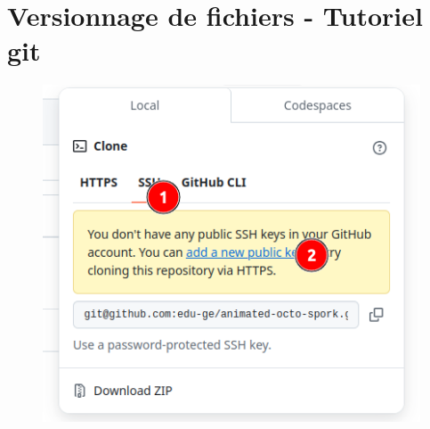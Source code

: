 \documentclass[11pt, a4paper]{book}
\begin{document}
\setcounter{chapter}{0}
\chapter{Versionnage de fichiers - Tutoriel git}


\begin{figure}
    \centering
    \includegraphics[width=0.5\linewidth]{ssh.png}
\end{figure}
\end{document}
